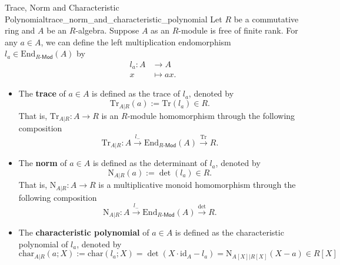 \begin{definition}{Trace, Norm and Characteristic Polynomial}{trace_norm_and_characteristic_polynomial}
    Let $R$ be a commutative ring and $A$ be an $R$-algebra. Suppose $A$ as an $R$-module is free of finite rank. For any $a\in A$, we can define the left multiplication endomorphism $l_a\in\mathrm{End}_{R\text{-}\mathsf{Mod}}(A)$ by
    \begin{align*}
        l_a:A &\longrightarrow A\\
        x &\longmapsto ax.
    \end{align*}
    \begin{itemize}
        \item The \textbf{trace} of $a\in A$ is defined as the trace of $l_a$, denoted by 
        \[
        \mathrm{Tr}_{A|R}(a):=\mathrm{Tr}(l_a) \in R.
        \]
        That is, $\mathrm{Tr}_{A|R}:A\to R$ is an $R$-module homomorphism through the following composition
        \[
            \mathrm{Tr}_{A|R}: A\xrightarrow{l_{-}} \mathrm{End}_{R\text{-}\mathsf{Mod}}(A)\xrightarrow{\mathrm{Tr}} R.
        \]
        \item The \textbf{norm} of $a\in A$ is defined as the determinant of $l_a$, denoted by
        \[
        \mathrm{N}_{A|R}(a):=\det(l_a) \in R.
        \]
        That is, $\mathrm{N}_{A|R}:A\to R$ is a multiplicative monoid homomorphism through the following composition
        \[
            \mathrm{N}_{A|R}: A\xrightarrow{l_{-}} \mathrm{End}_{R\text{-}\mathsf{Mod}}(A)\xrightarrow{\det} R.
        \]
        \item The \textbf{characteristic polynomial} of $a\in A$ is defined as the characteristic polynomial of $l_a$, denoted by
        \[
        \mathrm{char}_{A|R}(a; X):=\mathrm{char}(l_a; X)=\det(X\cdot\mathrm{id}_A-l_a)= \mathrm{N}_{A[X]|R[X]}(X-a)\in R[X]
        \]
    \end{itemize}
\end{definition}

